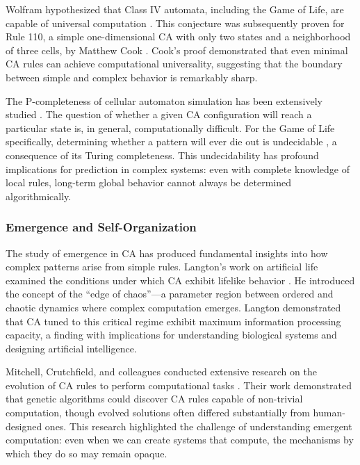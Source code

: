 Wolfram hypothesized that Class IV automata, including the Game of Life, are capable of universal computation \cite{wolfram1984cellular}. This conjecture was subsequently proven for Rule 110, a simple one-dimensional CA with only two states and a neighborhood of three cells, by Matthew Cook \cite{cook2004universality}. Cook's proof demonstrated that even minimal CA rules can achieve computational universality, suggesting that the boundary between simple and complex behavior is remarkably sharp.

The P-completeness of cellular automaton simulation has been extensively studied \cite{greenlaw1995completeness}. The question of whether a given CA configuration will reach a particular state is, in general, computationally difficult. For the Game of Life specifically, determining whether a pattern will ever die out is undecidable \cite{rendell2016game}, a consequence of its Turing completeness. This undecidability has profound implications for prediction in complex systems: even with complete knowledge of local rules, long-term global behavior cannot always be determined algorithmically.

\subsubsection{Emergence and Self-Organization}

The study of emergence in CA has produced fundamental insights into how complex patterns arise from simple rules. Langton's work on artificial life examined the conditions under which CA exhibit lifelike behavior \cite{langton1990computation}. He introduced the concept of the ``edge of chaos''---a parameter region between ordered and chaotic dynamics where complex computation emerges. Langton demonstrated that CA tuned to this critical regime exhibit maximum information processing capacity, a finding with implications for understanding biological systems and designing artificial intelligence.

Mitchell, Crutchfield, and colleagues conducted extensive research on the evolution of CA rules to perform computational tasks \cite{mitchell1993revisiting,mitchell1996evolving}. Their work demonstrated that genetic algorithms could discover CA rules capable of non-trivial computation, though evolved solutions often differed substantially from human-designed ones. This research highlighted the challenge of understanding emergent computation: even when we can create systems that compute, the mechanisms by which they do so may remain opaque.

